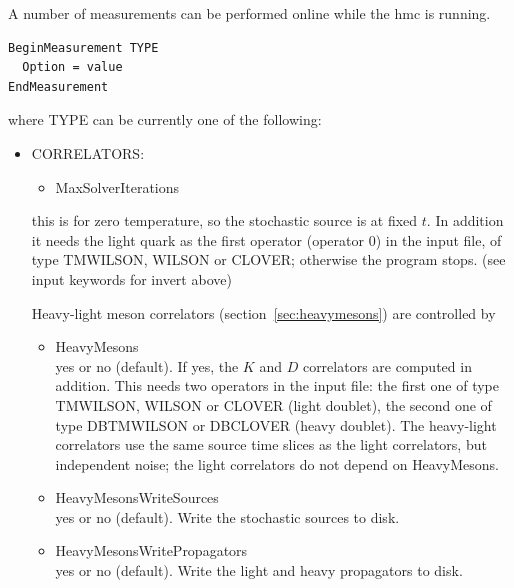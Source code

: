 A number of measurements can be performed online while the hmc is
running. 
\begin{verbatim}
BeginMeasurement TYPE
  Option = value
EndMeasurement
\end{verbatim}
where {\ttfamily TYPE} can be currently one of the following:
\begin{itemize}
\item {\ttfamily CORRELATORS}:
  \begin{itemize}
  \item {\ttfamily MaxSolverIterations}
  \end{itemize}
  this is for zero temperature, so the stochastic source is at fixed
  $t$. In addition it needs the light quark as the first operator (operator $0$) in the
  input file, of type {\ttfamily TMWILSON}, {\ttfamily WILSON} or {\ttfamily CLOVER};
  otherwise the program stops. (see input keywords for {\ttfamily invert} above)

  Heavy-light meson correlators (section~\ref{sec:heavymesons}) are controlled by
  \begin{itemize}
  \item {\ttfamily HeavyMesons} \\
    {\ttfamily yes} or {\ttfamily no} (default). If {\ttfamily yes}, the $K$ and $D$ correlators
    are computed in addition. This needs two operators in the input file: the first one of type
    {\ttfamily TMWILSON}, {\ttfamily WILSON} or {\ttfamily CLOVER} (light doublet),
    the second one of type {\ttfamily DBTMWILSON} or {\ttfamily DBCLOVER} (heavy doublet).
    The heavy-light correlators use the same source time slices as the light correlators,
    but independent noise; the light correlators do not depend on {\ttfamily HeavyMesons}.
  \item {\ttfamily HeavyMesonsWriteSources} \\
    {\ttfamily yes} or {\ttfamily no} (default). Write the stochastic sources to disk.
  \item {\ttfamily HeavyMesonsWritePropagators} \\
    {\ttfamily yes} or {\ttfamily no} (default). Write the light and heavy propagators to disk.
  \end{itemize}


\end{itemize}

